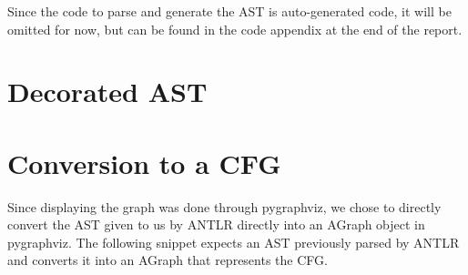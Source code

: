 \documentclass{article}
\begin{document}
{Since the code to parse and generate the AST is auto-generated code, it will be omitted for now, but can be found in the code appendix at the end of the report. 


\section{Decorated AST}

\section{Conversion to a CFG}
Since displaying the graph was done through pygraphviz, we chose to
directly convert the AST given to us by ANTLR directly into an AGraph
object in pygraphviz. The following snippet expects an AST previously
parsed by ANTLR and converts it into an AGraph that represents the
CFG.

}
\end{document}
